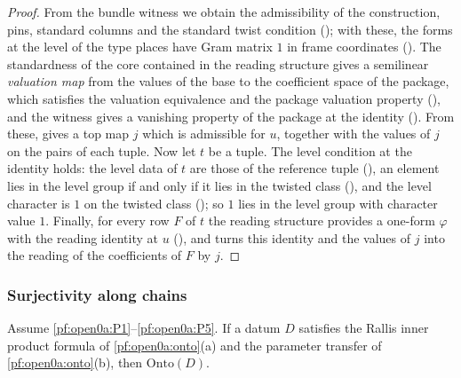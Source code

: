 \begin{proof}
From the bundle witness we obtain the admissibility of the construction, pins, standard columns and the standard twist
condition (); with these, the forms at the level of the type places
have Gram matrix $1$ in frame coordinates ().
The standardness of the core contained in the reading structure gives a semilinear \emph{valuation map} from the
values of the base to the coefficient space of the package, which satisfies the valuation equivalence and the
package valuation property (), and the witness gives a vanishing
property of the package at the identity (). From these,
 gives a top map $j$ which is admissible for $u$,
together with the values of $j$ on the pairs of each tuple. Now let $t$ be a tuple. The level condition at the
identity holds: the level data of $t$ are those of the reference tuple
(), an element lies in the level group if and only if it
lies in the twisted class (), and the level character is $1$
on the twisted class (); so $1$ lies in the level group
with character value $1$. Finally, for every row $F$ of $t$ the reading structure provides a one-form $\varphi$ with the
reading identity at $u$ (), and
 turns this identity and the values of $j$ into the reading of the
coefficients of $F$ by $j$.
\end{proof}

\subsubsection{Surjectivity along chains}

\begin{proposition}\label{pf:open0a:ontoclassical}
Assume \ref{pf:open0a:P1}--\ref{pf:open0a:P5}. If a datum $D$ satisfies the Rallis inner product formula of
\cref{pf:open0a:onto}(a) and the parameter transfer of \cref{pf:open0a:onto}(b), then $\mathrm{Onto}(D)$.
\end{proposition}

